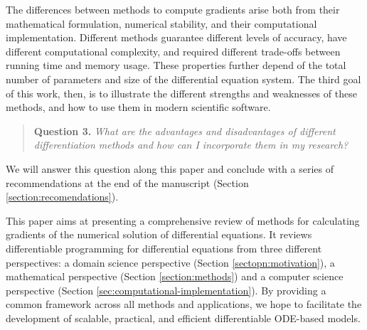 The differences between methods to compute gradients arise both from their mathematical formulation, numerical stability, and their computational implementation. 
Different methods guarantee different levels of accuracy, have different computational complexity, and required different trade-offs between running time and memory usage. 
These properties further depend of the total number of parameters and size of the differential equation system. 
The third goal of this work, then, is to illustrate the different strengths and weaknesses of these methods, and how to use them in modern scientific software. 
\begin{quote}
    \textbf{Question 3. }
    \textit{What are the advantages and disadvantages of different differentiation methods and how can I incorporate them in my research?}
\end{quote}
We will answer this question along this paper and conclude with a series of recommendations at the end of the manuscript (Section \ref{section:recomendations}).

This paper aims at presenting a comprehensive review of methods for calculating gradients of the numerical solution of differential equations. 
It reviews differentiable programming for differential equations from three different perspectives: a domain science perspective (Section \ref{sectopn:motivation}), a mathematical perspective (Section \ref{section:methods}) and a computer science perspective (Section \ref{sec:computational-implementation}). 
By providing a common framework across all methods and applications, we hope to facilitate the development of scalable, practical, and efficient differentiable ODE-based models. 


